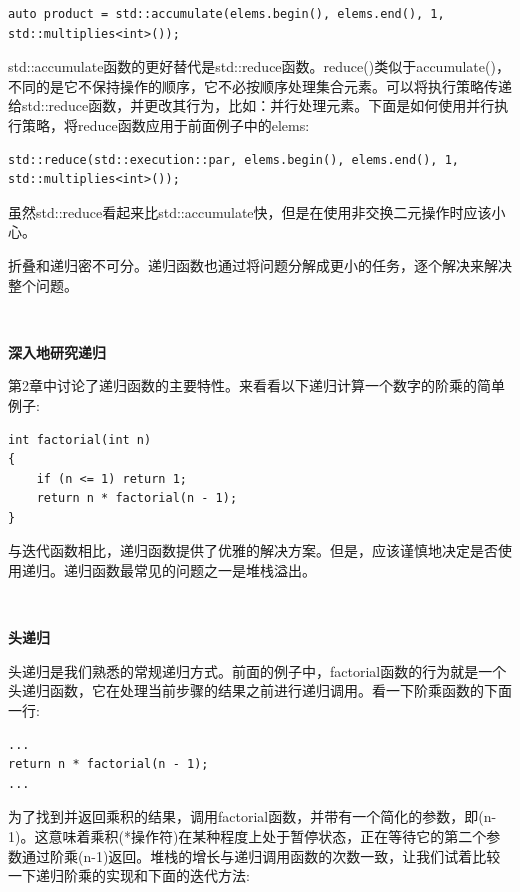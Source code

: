 \begin{lstlisting}[caption={}]
auto product = std::accumulate(elems.begin(), elems.end(), 1, std::multiplies<int>());
\end{lstlisting}

std::accumulate函数的更好替代是std::reduce函数。reduce()类似于accumulate()，不同的是它不保持操作的顺序，它不必按顺序处理集合元素。可以将执行策略传递给std::reduce函数，并更改其行为，比如：并行处理元素。下面是如何使用并行执行策略，将reduce函数应用于前面例子中的elems: \par

\begin{lstlisting}[caption={}]
std::reduce(std::execution::par, elems.begin(), elems.end(), 1, std::multiplies<int>());
\end{lstlisting}

虽然std::reduce看起来比std::accumulate快，但是在使用非交换二元操作时应该小心。 \par
折叠和递归密不可分。递归函数也通过将问题分解成更小的任务，逐个解决来解决整个问题。 \par

\noindent\textbf{}\ \par
\textbf{深入地研究递归} \ \par
第2章中讨论了递归函数的主要特性。来看看以下递归计算一个数字的阶乘的简单例子: \par

\begin{lstlisting}[caption={}]
int factorial(int n)
{
	if (n <= 1) return 1;
	return n * factorial(n - 1);
}
\end{lstlisting}

与迭代函数相比，递归函数提供了优雅的解决方案。但是，应该谨慎地决定是否使用递归。递归函数最常见的问题之一是堆栈溢出。 \par

\noindent\textbf{}\ \par
\textbf{头递归} \ \par
头递归是我们熟悉的常规递归方式。前面的例子中，factorial函数的行为就是一个头递归函数，它在处理当前步骤的结果之前进行递归调用。看一下阶乘函数的下面一行: \par

\begin{lstlisting}[caption={}]
...
return n * factorial(n - 1);
...
\end{lstlisting}

为了找到并返回乘积的结果，调用factorial函数，并带有一个简化的参数，即(n-1)。这意味着乘积(*操作符)在某种程度上处于暂停状态，正在等待它的第二个参数通过阶乘(n-1)返回。堆栈的增长与递归调用函数的次数一致，让我们试着比较一下递归阶乘的实现和下面的迭代方法: \par

